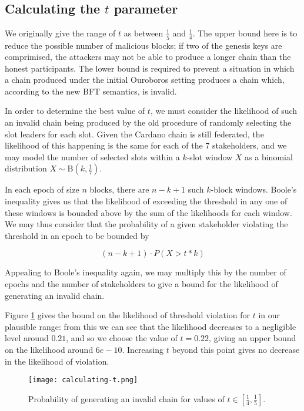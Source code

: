 \documentclass[11pt,a4paper]{article}
\begin{document}
\begin{appendices}
  \section{Calculating the $t$ parameter}
  \label{apdx:calculating-t}

  We originally give the range of $t$ as between $\frac{1}{5}$ and $\frac{1}{4}$.
  The upper bound here is to reduce the possible number of malicious blocks; if
  two of the genesis keys are comprimised, the attackers may not be able to
  produce a longer chain than the honest participants. The lower bound is required
  to prevent a situation in which a chain produced under the initial Ouroboros
  setting produces a chain which, according to the new BFT semantics, is invalid.

  In order to determine the best value of $t$, we must consider the likelihood of
  such an invalid chain being produced by the old procedure of randomly selecting
  the slot leaders for each slot. Given the Cardano chain is still federated, the
  likelihood of this happening is the same for each of the 7 stakeholders, and we
  may model the number of selected slots within a $k$-slot window $X$ as a binomial
  distribution $X \sim \mathrm{B}\left(k, \frac{1}{7}\right)$.

  In each epoch of size $n$ blocks, there are $n-k+1$ such $k$-block windows.
  Boole's inequality gives us that the likelihood of exceeding the threshold in
  any one of these windows is bounded above by the sum of the likelihoods for each
  window. We may thus consider that the probability of a given stakeholder
  violating the threshold in an epoch to be bounded by

  $$(n-k+1)\cdot P(X > t*k)$$

  Appealing to Boole's inequality again, we may multiply this by the number of
  epochs and the number of stakeholders to give a bound for the likelihood of
  generating an invalid chain.

  Figure \ref{fig:calculating-t} gives the bound on the likelihood of threshold
  violation for $t$ in our plausible range: from this we can see that the
  likelihood decreases to a negligible level around $0.21$, and so we choose the
  value of $t=0.22$, giving an upper bound on the likelihood around $6e-10$.
  Increasing $t$ beyond this point gives no decrease in the likelihood of
  violation.

  \begin{figure}[ht]
    \begin{center}
      \texttt{[image: calculating-t.png]}
    \end{center}
    \caption{Probability of generating an invalid chain for values of $t\in\left[
        \frac{1}{4}, \frac{1}{5} \right]$.}
    \label{fig:calculating-t}
  \end{figure}

\end{appendices}
\end{document}
